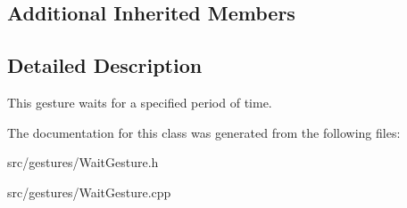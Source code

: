 \subsection*{Additional Inherited Members}


\subsection{Detailed Description}
This gesture waits for a specified period of time. 

The documentation for this class was generated from the following files\+:\begin{DoxyCompactItemize}
\item 
src/gestures/Wait\+Gesture.\+h\item 
src/gestures/Wait\+Gesture.\+cpp\end{DoxyCompactItemize}
